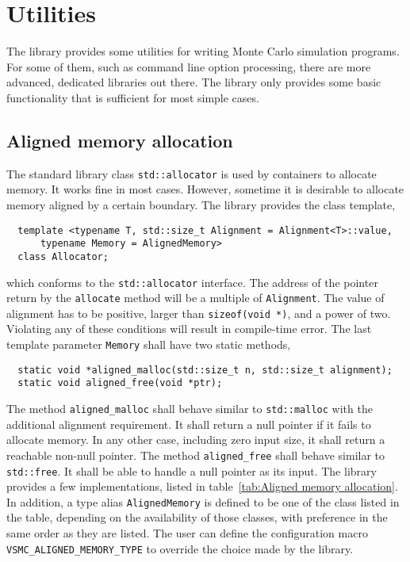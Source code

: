 \chapter{Utilities}
\label{chap:Utilities}

The library provides some utilities for writing Monte Carlo simulation
programs. For some of them, such as command line option processing, there are
more advanced, dedicated libraries out there. The library only provides some
basic functionality that is sufficient for most simple cases.

\section{Aligned memory allocation}
\label{sec:Aligned memory allocation}

The standard library class \verb|std::allocator| is used by containers to
allocate memory. It works fine in most cases. However, sometime it is desirable
to allocate memory aligned by a certain boundary. The library provides the
class template,
\begin{Verbatim}
  template <typename T, std::size_t Alignment = Alignment<T>::value,
      typename Memory = AlignedMemory>
  class Allocator;
\end{Verbatim}
which conforms to the \verb|std::allocator| interface. The address of the
pointer return by the \verb|allocate| method will be a multiple of
\verb|Alignment|. The value of alignment has to be positive, larger than
\verb|sizeof(void *)|, and a power of two. Violating any of these conditions
will result in compile-time error. The last template parameter \verb|Memory|
shall have two static methods,
\begin{Verbatim}
  static void *aligned_malloc(std::size_t n, std::size_t alignment);
  static void aligned_free(void *ptr);
\end{Verbatim}
The method \verb|aligned_malloc| shall behave similar to \verb|std::malloc|
with the additional alignment requirement. It shall return a null pointer if it
fails to allocate memory. In any other case, including zero input size, it
shall return a reachable non-null pointer. The method \verb|aligned_free| shall
behave similar to \verb|std::free|. It shall be able to handle a null pointer
as its input. The library provides a few implementations, listed in
table~\ref{tab:Aligned memory allocation}. In addition, a type alias
\verb|AlignedMemory| is defined to be one of the class listed in the table,
depending on the availability of those classes, with preference in the same
order as they are listed. The user can define the configuration macro
\verb|VSMC_ALIGNED_MEMORY_TYPE| to override the choice made by the library.

